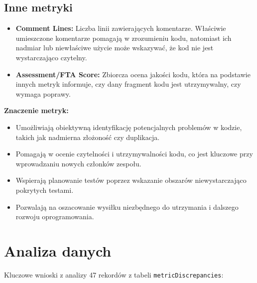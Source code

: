 \documentclass[a4paper,12pt]{article}
\begin{document}
\subsection{Inne metryki}
\begin{itemize} \item \textbf{Comment Lines:} Liczba linii zawierających komentarze. Właściwie umieszczone komentarze pomagają w zrozumieniu kodu, natomiast ich nadmiar lub niewłaściwe użycie może wskazywać, że kod nie jest wystarczająco czytelny. \item \textbf{Assessment/FTA Score:} Zbiorcza ocena jakości kodu, która na podstawie innych metryk informuje, czy dany fragment kodu jest utrzymywalny, czy wymaga poprawy. \end{itemize}
\textbf{Znaczenie metryk:}
\begin{itemize} \item Umożliwiają obiektywną identyfikację potencjalnych problemów w kodzie, takich jak nadmierna złożoność czy duplikacja. \item Pomagają w ocenie czytelności i utrzymywalności kodu, co jest kluczowe przy wprowadzaniu nowych członków zespołu. \item Wspierają planowanie testów poprzez wskazanie obszarów niewystarczająco pokrytych testami. \item Pozwalają na oszacowanie wysiłku niezbędnego do utrzymania i dalszego rozwoju oprogramowania. \end{itemize}

\section{Analiza danych}
Kluczowe wnioski z analizy 47 rekordów z tabeli \texttt{metricDiscrepancies}:
\end{document}

